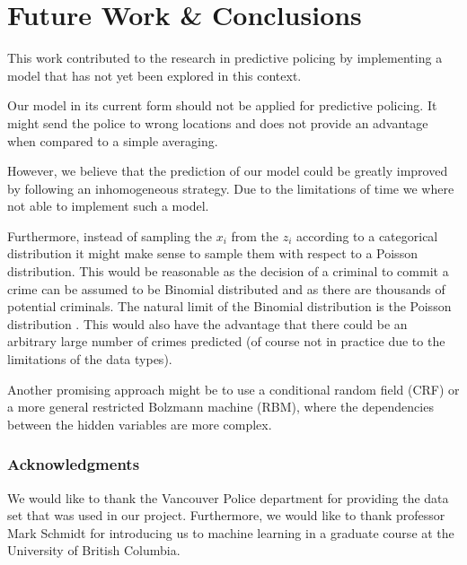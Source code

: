 \documentclass{article}
\begin{document}
\section{Future Work \& Conclusions}
\label{sec:FWC}

This work contributed to the research in predictive policing by implementing a model that has not yet been explored in this context. 

Our model in its current form should not be applied for predictive policing. It might send the police to wrong locations and does not provide an advantage when compared to a simple averaging.

However, we believe that the prediction of our model could be greatly improved by following an inhomogeneous strategy. Due to the limitations of time we where not able to implement such a model.

Furthermore, instead of sampling the $x_i$ from the $z_i$ according to a categorical distribution it might make sense to sample them with respect to a Poisson distribution. This would be reasonable as the decision of a criminal to commit a crime can be assumed to be Binomial distributed and as there are thousands of potential criminals. The natural limit of the Binomial distribution is the Poisson distribution . This would also have the advantage that there could be an arbitrary large number of crimes predicted (of course not in practice due to the limitations of the data types).

Another promising approach might be to use a conditional random field (CRF) or a more general restricted Bolzmann machine (RBM), where the dependencies between the hidden variables are  more complex. 



\subsubsection*{Acknowledgments}

We would like to thank the Vancouver Police department for providing the data set that was used in our project. Furthermore, we would like to thank professor Mark Schmidt for introducing us to machine learning in a graduate course at the University of British Columbia.

\newpage
\printbibliography
\end{document}
